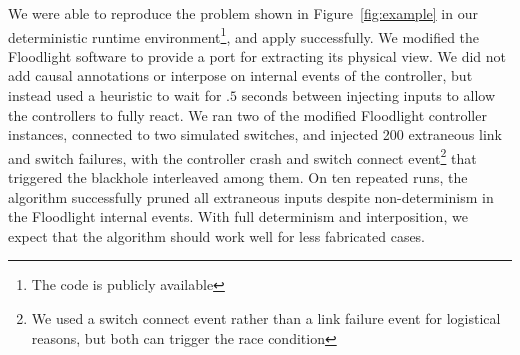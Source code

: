 
We were able to reproduce the problem shown in Figure~\ref{fig:example} in our
deterministic runtime environment\footnote{The code is publicly available},
and apply \simulator{} successfully.
We modified the Floodlight software to provide a port for extracting its
physical view. We did not add causal
annotations or interpose on internal events of the controller, but instead used a
heuristic to wait for $.5$ seconds between injecting inputs to allow the
controllers to fully react. We ran two of the modified Floodlight controller
instances, connected to two simulated switches, and injected 200 extraneous link
and switch failures, with the controller crash and switch connect event\footnote{We used a switch connect
event rather than a link failure event for logistical reasons, but both
can trigger the race condition} that triggered the blackhole interleaved among them.
On ten repeated runs, the algorithm successfully pruned all extraneous
inputs despite non-determinism in the Floodlight internal events. With full determinism and
interposition, we expect that the algorithm should work well for less
fabricated cases.
